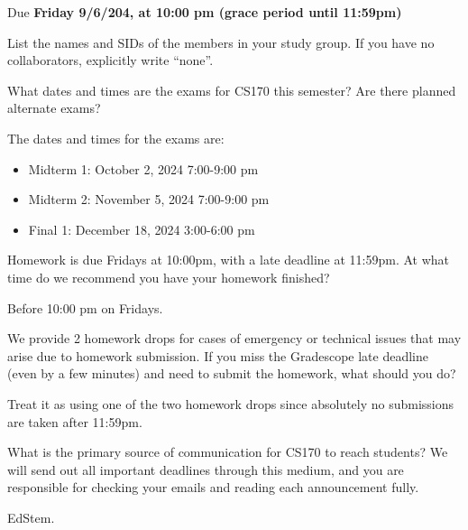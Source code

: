 \documentclass[11pt]{article}
\def\duedate{Friday 9/6/204, at 10:00 pm (grace period until 11:59pm)}
\begin{document}
\maketitle
Due \textbf{\duedate}


List the names and SIDs of the members in your study group.
If you have no collaborators, explicitly write ``none''.



\begin{subparts}
    \subpart What dates and times are the exams for CS170 this semester? Are there planned alternate exams?

    \begin{solution}
        The dates and times for the exams are:
        \begin{itemize}
            \item Midterm 1: October 2, 2024 7:00-9:00 pm
            \item Midterm 2: November 5, 2024 7:00-9:00 pm
            \item Final 1: December 18, 2024 3:00-6:00 pm
        \end{itemize}
    \end{solution}

    \subpart Homework is due Fridays at 10:00pm, with a late deadline at 11:59pm. At what time do we recommend you have your homework finished?

    \begin{solution}
        Before 10:00 pm on Fridays.
    \end{solution}

    \subpart We provide 2 homework drops for cases of emergency or technical issues that may arise due to homework submission. 
    If you miss the Gradescope late deadline (even by a few minutes) and need to submit the homework, what should you do?

    \begin{solution}
        Treat it as using one of the two homework drops since absolutely no submissions are taken after 11:59pm.    
    \end{solution}
    
    \subpart What is the primary source of communication for CS170 to reach students? 
    We will send out all important deadlines through this medium, and you are responsible for checking your emails and reading each announcement fully.

    \begin{solution}
        EdStem.
    \end{solution}


\end{subparts}
\end{document}
